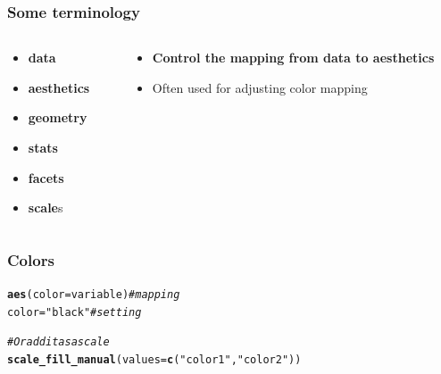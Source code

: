 \documentclass{beamer}\usepackage[]{graphicx}\usepackage[]{color}
\makeatletter
\newcommand{\hlstr}[1]{\textcolor[rgb]{0.192,0.494,0.8}{#1}}%
\newcommand{\hlcom}[1]{\textcolor[rgb]{0.678,0.584,0.686}{\textit{#1}}}%
\newcommand{\hlstd}[1]{\textcolor[rgb]{0.345,0.345,0.345}{#1}}%
\newcommand{\hlkwb}[1]{\textcolor[rgb]{0.69,0.353,0.396}{#1}}%
\newcommand{\hlkwc}[1]{\textcolor[rgb]{0.333,0.667,0.333}{#1}}%
\newcommand{\hlkwd}[1]{\textcolor[rgb]{0.737,0.353,0.396}{\textbf{#1}}}%
\newenvironment{kframe}{%
 \def\at@end@of@kframe{}%
 \ifinner\ifhmode%
  \def\at@end@of@kframe{\end{minipage}}%
  \begin{minipage}{\columnwidth}%
 \fi\fi%
 \def\FrameCommand##1{\hskip\@totalleftmargin \hskip-\fboxsep
 \colorbox{shadecolor}{##1}\hskip-\fboxsep
     \hskip-\linewidth \hskip-\@totalleftmargin \hskip\columnwidth}%
 \MakeFramed {\advance\hsize-\width
   \@totalleftmargin\z@ \linewidth\hsize
   \@setminipage}}%
 {\par\unskip\endMakeFramed%
 \at@end@of@kframe}
\newenvironment{knitrout}{}{} %
\makeatother
\begin{document}
\begin{frame}[fragile]
\frametitle{Some terminology}
\begin{columns}[t]

\begin{column}[T]{3cm}
\begin{itemize}
    \item \textbf{\color{gray}data}
    \item \textbf{\color{gray}aesthetics}
    \item \textbf{\color{gray}geometry}
    \item \textbf{\color{gray}stats}
    \item \textbf{\color{gray}facets}
    \item \textbf{scale}s
\end{itemize}
\end{column}

\begin{column}[T]{8cm}
\begin{itemize}
    \item \textbf{Control the mapping from data to aesthetics}
    \item Often used for adjusting color mapping
\end{itemize}
\end{column}

\end{columns}
\end{frame}


\begin{frame}[fragile]
\frametitle{Colors}
\begin{knitrout}\footnotesize
{}\color{fgcolor}\begin{kframe}
\begin{alltt}
\hlkwd{aes}\hlstd{(}\hlkwc{color} \hlstd{= variable)} \hlcom{# mapping}
\hlstd{color} \hlkwb{=} \hlstr{"black"} \hlcom{# setting}

\hlcom{# Or add it as a scale}
\hlkwd{scale_fill_manual}\hlstd{(}\hlkwc{values} \hlstd{=} \hlkwd{c}\hlstd{(}\hlstr{"color1"}\hlstd{,} \hlstr{"color2"}\hlstd{))}
\end{alltt}
\end{kframe}
\end{knitrout}
\end{frame}

\end{document}
